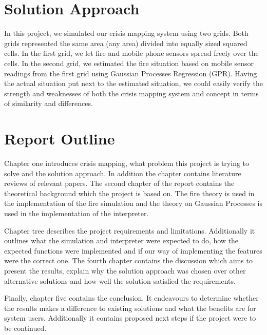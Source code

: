 \section{Solution Approach}

In this project, we simulated our crisis mapping system using two grids. Both grids represented the same area (any area) divided into equally sized squared cells. In the first grid, we let fire and mobile phone sensors spread freely over the cells. In the second grid, we estimated the fire situation based on mobile sensor readings from the first grid using Gaussian Processes Regression (GPR). Having the actual situation put next to the estimated situation, we could easily verify the strength and weaknesses of both the crisis mapping system and concept in terms of similarity and differences.

\section{Report Outline}

Chapter one introduces crisis mapping, what problem this project is trying to solve and the solution approach. In addition the chapter contains literature reviews of relevant papers. The second chapter of the report contains the theoretical background which the project is based on. The fire theory is used in the implementation of the fire simulation and the theory on Gaussian Processes is used in the implementation of the interpreter.

Chapter tree describes the project requirements and limitations. Additionally it outlines what the simulation and interpreter were expected to do, how the expected functions were implemented and if our way of implementing the features were the correct one. The fourth chapter contains the discussion which aims to present the results, explain why the solution approach was chosen over other alternative solutions and how well the solution satisfied the requirements.

Finally, chapter five contains the conclusion. It endeavours to determine whether the results makes a difference to existing solutions and what the benefits are for system users. Additionally it contains proposed next steps if the project were to be continued.